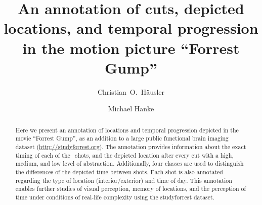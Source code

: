 \documentclass[10pt,a4paper]{article}
\begin{document}


\title{An annotation of cuts, depicted locations, and temporal progression in
the motion picture ``Forrest Gump''}

\author[1]{Christian~O.~Häusler}
\author[1,2]{Michael Hanke}

\maketitle
\thispagestyle{fancy}

\begin{multicols}{1}
\begin{abstract}

Here we present an annotation of locations and temporal progression depicted in
the movie ``Forrest Gump'', as an addition to a large public functional brain
imaging dataset (\url{http://studyforrest.org}). The annotation provides
information about the exact timing of each of the \NShots\ shots, and the
depicted location after every cut with a high, medium, and low level of
abstraction. Additionally, four classes are used to distinguish the differences
of the depicted time between shots. Each shot is also annotated regarding the
type of location (interior/exterior) and time of day. This annotation enables
further studies of visual perception, memory of locations, and the perception of
time under conditions of real-life complexity using the studyforrest dataset.

\end{abstract}
\end{multicols}
\end{document}
